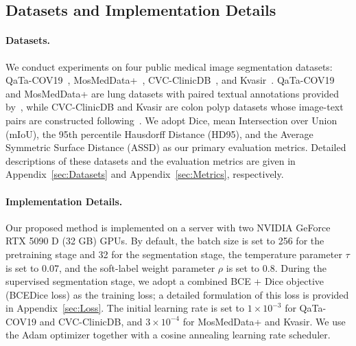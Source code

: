 \documentclass{article} %
\begin{document}
\subsection{Datasets and Implementation Details}

\paragraph{Datasets.}

We conduct experiments on four public medical image segmentation datasets: QaTa-COV19~\citep{degerli2022osegnet}, MosMedData+~\citep{morozov2020mosmeddata,hofmanninger2020automatic}, CVC-ClinicDB~\citep{bernal2015wm}, and Kvasir~\citep{jha2019kvasir}. QaTa-COV19 and MosMedData+ are lung datasets with paired textual annotations provided by~\citet{li2023lvit}, while CVC-ClinicDB and Kvasir are colon polyp datasets whose image-text pairs are constructed following~\citet{zhang2024madapter}. We adopt Dice, mean Intersection over Union (mIoU), the 95th percentile Hausdorff Distance (HD95), and the Average Symmetric Surface Distance (ASSD) as our primary evaluation metrics. Detailed descriptions of these datasets and the evaluation metrics are given in Appendix~\ref{sec:Datasets} and Appendix~\ref{sec:Metrics}, respectively.

\paragraph{Implementation Details.}

Our proposed method is implemented on a server with two NVIDIA GeForce RTX 5090 D (32 GB) GPUs. By default, the batch size is set to 256 for the pretraining stage and 32 for the segmentation stage, the temperature parameter $\tau$ is set to 0.07, and the soft-label weight parameter $\rho$ is set to 0.8. During the supervised segmentation stage, we adopt a combined BCE + Dice objective (BCEDice loss) as the training loss; a detailed formulation of this loss is provided in Appendix~\ref{sec:Loss}. The initial learning rate is set to $1 \times 10^{-3}$ for QaTa-COV19 and CVC-ClinicDB, and $3 \times 10^{-4}$ for MosMedData+ and Kvasir. We use the Adam optimizer together with a cosine annealing learning rate scheduler.
\end{document}
